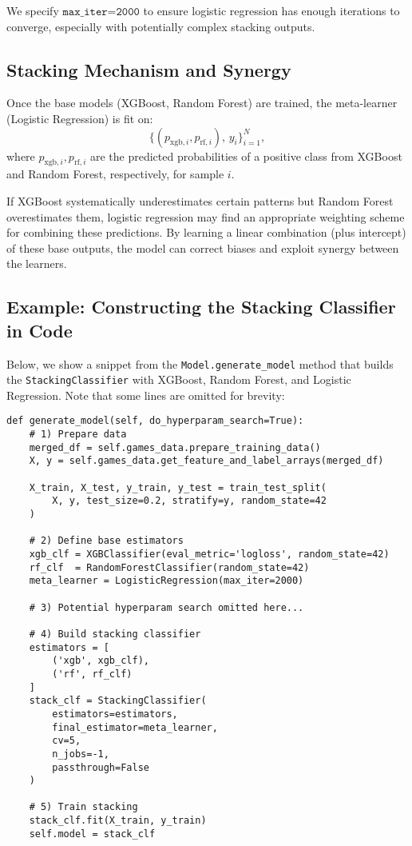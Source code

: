\documentclass[12pt]{article}
\begin{document}
\noindent We specify \(\texttt{max\_iter=2000}\) to ensure logistic regression has enough iterations to converge, especially with potentially complex stacking outputs.

\subsection{Stacking Mechanism and Synergy}
Once the base models (XGBoost, Random Forest) are trained, the meta-learner (Logistic Regression) is fit on:
\[
\big\{ (p_{\text{xgb},i}, p_{\text{rf},i}),\, y_i \big\}_{i=1}^N,
\]
where \(p_{\text{xgb},i}, p_{\text{rf},i}\) are the predicted probabilities of a positive class from XGBoost and Random Forest, respectively, for sample \(i\).

If XGBoost systematically underestimates certain patterns but Random Forest overestimates them, logistic regression may find an appropriate weighting scheme for combining these predictions. By learning a linear combination (plus intercept) of these base outputs, the model can correct biases and exploit synergy between the learners.

\subsection{Example: Constructing the Stacking Classifier in Code}
Below, we show a snippet from the \texttt{Model.generate\_model} method that builds the \texttt{StackingClassifier} with XGBoost, Random Forest, and Logistic Regression. Note that some lines are omitted for brevity:

\begin{verbatim}
def generate_model(self, do_hyperparam_search=True):
    # 1) Prepare data
    merged_df = self.games_data.prepare_training_data()
    X, y = self.games_data.get_feature_and_label_arrays(merged_df)

    X_train, X_test, y_train, y_test = train_test_split(
        X, y, test_size=0.2, stratify=y, random_state=42
    )

    # 2) Define base estimators
    xgb_clf = XGBClassifier(eval_metric='logloss', random_state=42)
    rf_clf  = RandomForestClassifier(random_state=42)
    meta_learner = LogisticRegression(max_iter=2000)

    # 3) Potential hyperparam search omitted here...
    
    # 4) Build stacking classifier
    estimators = [
        ('xgb', xgb_clf),
        ('rf', rf_clf)
    ]
    stack_clf = StackingClassifier(
        estimators=estimators,
        final_estimator=meta_learner,
        cv=5,
        n_jobs=-1,
        passthrough=False
    )

    # 5) Train stacking
    stack_clf.fit(X_train, y_train)
    self.model = stack_clf
\end{verbatim}
\end{document}
